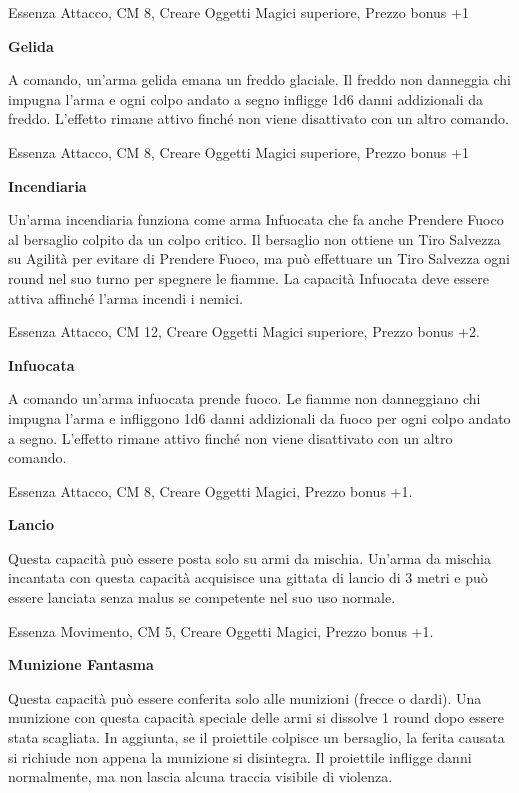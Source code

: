 \documentclass[a4paper,11pt,twoside,openany]{book}
\begin{document}
Essenza Attacco, CM 8, Creare Oggetti Magici superiore, Prezzo bonus +1

\textbf{Gelida}

A comando, un'arma gelida emana un freddo glaciale. Il freddo non danneggia chi impugna l'arma e ogni colpo andato a segno infligge 1d6 danni addizionali da freddo. L'effetto rimane attivo finché non viene disattivato con un altro comando.

Essenza Attacco, CM 8, Creare Oggetti Magici superiore, Prezzo bonus +1

\textbf{Incendiaria}

Un'arma incendiaria funziona come arma Infuocata che fa anche Prendere Fuoco al bersaglio colpito da un colpo critico. Il bersaglio non ottiene un Tiro Salvezza su Agilità per evitare di Prendere Fuoco, ma può effettuare un Tiro Salvezza ogni round nel suo turno per spegnere le fiamme. La capacità Infuocata deve essere attiva affinché l'arma incendi i nemici.

Essenza Attacco, CM 12, Creare Oggetti Magici superiore, Prezzo bonus +2.

\textbf{Infuocata}

A comando un'arma infuocata prende fuoco. Le fiamme non danneggiano chi impugna l'arma e infliggono 1d6 danni addizionali da fuoco per ogni colpo andato a segno. L'effetto rimane attivo finché non viene disattivato con un altro comando.

Essenza Attacco, CM 8, Creare Oggetti Magici, Prezzo bonus +1.

\textbf{Lancio}

Questa capacità può essere posta solo su armi da mischia. Un'arma da mischia incantata con questa capacità acquisisce una gittata di lancio di 3 metri e può essere lanciata senza malus se competente nel suo uso normale.

Essenza Movimento, CM 5, Creare Oggetti Magici, Prezzo bonus +1.

\textbf{Munizione Fantasma}

Questa capacità può essere conferita solo alle munizioni (frecce o dardi). Una munizione con questa capacità speciale delle armi si dissolve 1 round dopo essere stata scagliata. In aggiunta, se il proiettile colpisce un bersaglio, la ferita causata si richiude non appena la munizione si disintegra. Il proiettile infligge danni normalmente, ma non lascia alcuna traccia visibile di violenza.
\end{document}
